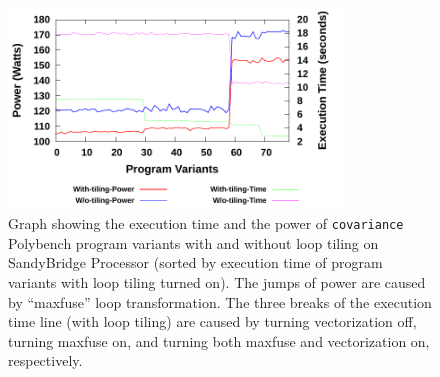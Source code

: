 %
%

\begin{figure}[bt]
    \includegraphics[width=3.5in]{Covariance}
    \caption{Graph showing the execution time and the power of \texttt{covariance} Polybench program variants with 
and without loop tiling on SandyBridge Processor (sorted by execution time of program variants with loop tiling turned on).
 The jumps of power are caused by ``maxfuse'' loop transformation. The three breaks of the execution time line (with loop tiling)
are caused by turning vectorization off, turning maxfuse on, and turning both maxfuse and vectorization on, respectively.}
    \label{fig:TE}
\end{figure}
